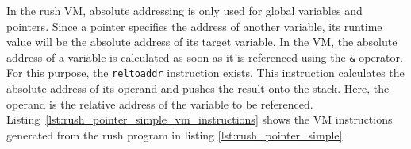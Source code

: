 
In the rush VM, absolute addressing is only used for global variables and pointers.
Since a pointer specifies the address of another variable, its runtime value will be the absolute address of its target variable.
In the VM, the absolute address of a variable is calculated as soon as it is referenced using the \texttt{\&} operator.
For this purpose, the \texttt{reltoaddr} instruction exists.
This instruction calculates the absolute address of its operand and pushes the result onto the stack.
Here, the operand is the relative address of the variable to be referenced.
Listing~\ref{lst:rush_pointer_simple_vm_instructions} shows the VM instructions generated from the rush program in listing \ref{lst:rush_pointer_simple}.


